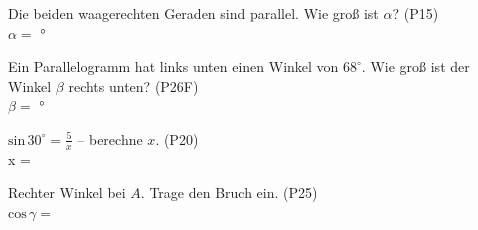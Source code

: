 \documentclass[11pt]{article}
\begin{document}
\begin{aufgabe}{\begin{minipage}[t]{0.6\linewidth}Die beiden waagerechten Geraden sind parallel. Wie groß ist $\alpha$? \hfill (P15) \\ $\alpha =$ \leerfeld °\end{minipage}\hfill\begin{minipage}[t]{0.37\linewidth}\vspace{0pt}
\end{minipage}}
\end{aufgabe}

\begin{aufgabe}{\begin{minipage}[t]{0.6\linewidth}Ein Parallelogramm hat links unten einen Winkel von $68^\circ$. Wie groß ist der Winkel $\beta$ rechts unten? \hfill (P26F) \\ $\beta =$ \leerfeld °\end{minipage}\hfill\begin{minipage}[t]{0.37\linewidth}\vspace{0pt}
\end{minipage}}
\end{aufgabe}

\begin{aufgabe}{$\mathrm{sin}\,30^\circ = \frac{5}{x}$ – berechne $x$. \hfill (P20) \\ x = \leerfeld}
\end{aufgabe}

\begin{aufgabe}{\begin{minipage}[t]{0.6\linewidth}Rechter Winkel bei $A$. Trage den Bruch ein. \hfill (P25) \\ $\mathrm{cos}\,\gamma =$ \leerfeld\end{minipage}\hfill\begin{minipage}[t]{0.37\linewidth}\vspace{0pt}
\end{minipage}}
\end{aufgabe}

\begleitteil
{}
\end{document}
